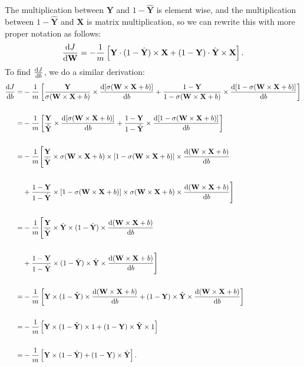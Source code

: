 \documentclass{article}
\begin{document}
\noindent The multiplication between \textbf{Y} and $1-\hat{\textbf{Y}}$ is element wise, and the multiplication between $1-\hat{\textbf{Y}}$ and \textbf{X} is matrix multiplication, so we can rewrite this with more proper notation as follows:
\[\diff{J}{\textbf{W}} = -\frac{1}{m}\left[\textbf{Y} \cdot (1-\hat{\textbf{Y}}) \times \textbf{X} + (1-\textbf{Y}) \cdot \hat{\textbf{Y}} \times \textbf{X}\right].\]
To find $\diff{J}{b}$, we do a similar derivation:
\begin{align*}
\diff{J}{b}=&-\frac{1}{m}\left[\frac{\textbf{Y}}{\sigma(\textbf{W}\times \textbf{X}+b)}\times \diff{[\sigma(\textbf{W}\times \textbf{X}+b)]}{b} + \frac{1-\textbf{Y}}{1-\sigma(\textbf{W}\times \textbf{X}+b)}\times \diff{[1-\sigma(\textbf{W}\times \textbf{X}+b)]}{b}\right]\\\\
=&-\frac{1}{m}\left[\frac{\textbf{Y}}{\hat{\textbf{Y}}}\times \diff{[\sigma(\textbf{W}\times \textbf{X}+b)]}{b} + \frac{1-\textbf{Y}}{1-\hat{\textbf{Y}}}\times \diff{[1-\sigma(\textbf{W}\times \textbf{X}+b)]}{b}\right]\\\\
=&-\frac{1}{m}\Bigg[\frac{\textbf{Y}}{\hat{\textbf{Y}}}\times \sigma(\textbf{W}\times \textbf{X}+b) \times [1-\sigma(\textbf{W}\times \textbf{X}+b)]\times \diff{(\textbf{W}\times \textbf{X}+b)}{b} \\\\
&+ \frac{1-\textbf{Y}}{1-\hat{\textbf{Y}}}\times [1 - \sigma(\textbf{W}\times \textbf{X}+b)] \times \sigma(\textbf{W}\times \textbf{X}+b)\times \diff{(\textbf{W}\times \textbf{X}+b)}{b}\Bigg]\\\\
=&-\frac{1}{m}\Bigg[\frac{\textbf{Y}}{\hat{\textbf{Y}}}\times \hat{\textbf{Y}} \times (1-\hat{\textbf{Y}})\times \diff{(\textbf{W}\times \textbf{X}+b)}{b} \\\\
&+ \frac{1-\textbf{Y}}{1-\hat{\textbf{Y}}}\times (1 - \hat{\textbf{Y}}) \times \hat{\textbf{Y}} \times \diff{(\textbf{W}\times \textbf{X}+b)}{b}\Bigg]\\\\
=&-\frac{1}{m}\left[\textbf{Y} \times (1-\hat{\textbf{Y}})\times \diff{(\textbf{W}\times \textbf{X}+b)}{b} + (1-\textbf{Y}) \times \hat{\textbf{Y}} \times \diff{(\textbf{W}\times \textbf{X}+b)}{b}\right]\\\\
=&-\frac{1}{m}\left[\textbf{Y} \times (1-\hat{\textbf{Y}}) \times 1 + (1-\textbf{Y}) \times \hat{\textbf{Y}} \times 1\right]\\\\
=&-\frac{1}{m}\left[\textbf{Y} \times (1-\hat{\textbf{Y}}) + (1-\textbf{Y}) \times \hat{\textbf{Y}}\right].
\end{align*}
\end{document}
